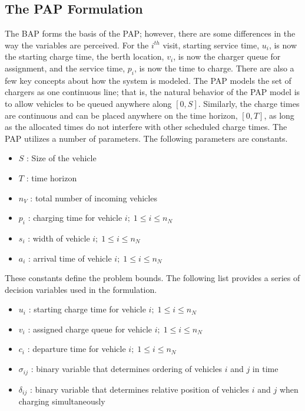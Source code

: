 \subsection{The PAP Formulation}
The BAP forms the basis of the PAP; however, there are some differences in the way the variables are perceived. For the
$i^{th}$ visit, starting service time, $u_i$, is now the starting charge time, the berth location, $v_i$, is now the
charger queue for assignment, and the service time, $p_i$, is now the time to charge. There are also a few key concepts
about how the system is modeled. The PAP models the set of chargers as one continuous line; that is, the natural
behavior of the PAP model is to allow vehicles to be queued anywhere along $[0,S]$. Similarly, the charge times are
continuous and can be placed anywhere on the time horizon, $[0,T]$, as long as the allocated times do not interfere with
other scheduled charge times. The PAP utilizes a number of parameters. The following parameters are constants.

\begin{itemize}
	\item $S$   : Size of the vehicle
	\item $T$   : time horizon
	\item $n_V$ : total number of incoming vehicles
	\item $p_i$ : charging time for vehicle $i;\; 1 \leq i \leq n_N$
	\item $s_i$ : width of vehicle $i;\; 1 \leq i \leq n_N$
	\item $a_i$ : arrival time of vehicle $i;\; 1 \leq i \leq n_N$
\end{itemize}

These constants define the problem bounds. The following list provides a series of decision variables used in the
formulation.

\begin{itemize}
    \item $u_i$    : starting charge time for vehicle $i;\; 1 \leq i \leq n_N$
    \item $v_i$    : assigned charge queue for vehicle $i;\; 1 \leq i \leq n_N$
    \item $c_i$    : departure time for vehicle $i;\; 1 \leq i \leq n_N$
    \item $\sigma_{ij}$ : binary variable that determines ordering of vehicles $i$ and $j$ in time
    \item $\delta_{ij}$ : binary variable that determines relative position of vehicles $i$ and $j$ when charging simultaneously
\end{itemize}

